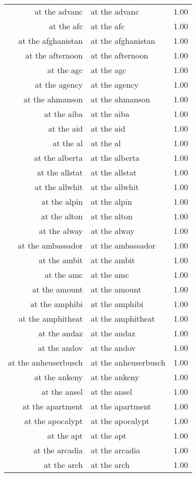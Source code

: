 \begin{table}[ht]
\begin{tabular}{rlr}
  at the advanc & at the advanc & 1.00 \\ 
  at the afc & at the afc & 1.00 \\ 
  at the afghanistan & at the afghanistan & 1.00 \\ 
  at the afternoon & at the afternoon & 1.00 \\ 
  at the agc & at the agc & 1.00 \\ 
  at the agency & at the agency & 1.00 \\ 
  at the ahmanson & at the ahmanson & 1.00 \\ 
  at the aiba & at the aiba & 1.00 \\ 
  at the aid & at the aid & 1.00 \\ 
  at the al & at the al & 1.00 \\ 
  at the alberta & at the alberta & 1.00 \\ 
  at the allstat & at the allstat & 1.00 \\ 
  at the allwhit & at the allwhit & 1.00 \\ 
  at the alpin & at the alpin & 1.00 \\ 
  at the alton & at the alton & 1.00 \\ 
  at the alway & at the alway & 1.00 \\ 
  at the ambassador & at the ambassador & 1.00 \\ 
  at the ambit & at the ambit & 1.00 \\ 
  at the amc & at the amc & 1.00 \\ 
  at the amount & at the amount & 1.00 \\ 
  at the amphibi & at the amphibi & 1.00 \\ 
  at the amphitheat & at the amphitheat & 1.00 \\ 
  at the andaz & at the andaz & 1.00 \\ 
  at the andov & at the andov & 1.00 \\ 
  at the anheuserbusch & at the anheuserbusch & 1.00 \\ 
  at the ankeny & at the ankeny & 1.00 \\ 
  at the ansel & at the ansel & 1.00 \\ 
  at the apartment & at the apartment & 1.00 \\ 
  at the apocalypt & at the apocalypt & 1.00 \\ 
  at the apt & at the apt & 1.00 \\ 
  at the arcadia & at the arcadia & 1.00 \\ 
  at the arch & at the arch & 1.00 \\ 

\end{tabular}
\end{table}
